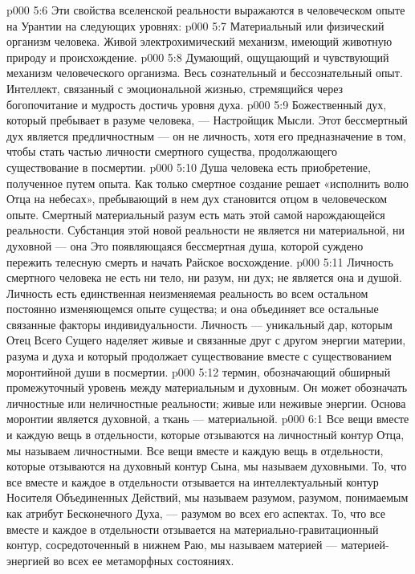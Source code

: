 \vs p000 5:6 \pc Эти свойства вселенской реальности выражаются в человеческом опыте на Урантии на следующих уровнях:
\vs p000 5:7 \bibnobreakspace {} Материальный или физический организм человека. Живой электрохимический механизм, имеющий животную природу и происхождение.
\vs p000 5:8 \bibnobreakspace {} Думающий, ощущающий и чувствующий механизм человеческого организма. Весь сознательный и бессознательный опыт. Интеллект, связанный с эмоциональной жизнью, стремящийся через богопочитание и мудрость достичь уровня духа.
\vs p000 5:9 \bibnobreakspace {} Божественный дух, который пребывает в разуме человека, --- Настройщик Мысли. Этот бессмертный дух является предличностным --- он не личность, хотя его предназначение в том, чтобы стать частью личности смертного существа, продолжающего существование в посмертии.
\vs p000 5:10 \bibnobreakspace {} Душа человека есть приобретение, полученное путем опыта. Как только смертное создание решает «исполнить волю Отца на небесах», пребывающий в нем дух становится отцом  в человеческом опыте. Смертный материальный разум есть мать этой самой нарождающейся реальности. Субстанция этой новой реальности не является ни материальной, ни духовной --- она  Это появляющаяся бессмертная душа, которой суждено пережить телесную смерть и начать Райское восхождение.
\vs p000 5:11 \bibnobreakspace {} Личность смертного человека не есть ни тело, ни разум, ни дух; не является она и душой. Личность есть единственная неизменяемая реальность во всем остальном постоянно изменяющемся опыте существа; и она объединяет все остальные связанные факторы индивидуальности. Личность --- уникальный дар, которым Отец Всего Сущего наделяет живые и связанные друг с другом энергии материи, разума и духа и который продолжает существование вместе с существованием моронтийной души в посмертии.
\vs p000 5:12 \bibnobreakspace {} термин, обозначающий обширный промежуточный уровень между материальным и духовным. Он может обозначать личностные или неличностные реальности; живые или неживые энергии. Основа моронтии является духовной, а ткань --- материальной.
\vs p000 6:1 Все вещи вместе и каждую вещь в отдельности, которые отзываются на личностный контур Отца, мы называем личностными. Все вещи вместе и каждую вещь в отдельности, которые отзываются на духовный контур Сына, мы называем духовными. То, что все вместе и каждое в отдельности отзывается на интеллектуальный контур Носителя Объединенных Действий, мы называем разумом, разумом, понимаемым как атрибут Бесконечного Духа, --- разумом во всех его аспектах. То, что все вместе и каждое в отдельности отзывается на материально\hyp{}гравитационный контур, сосредоточенный в нижнем Раю, мы называем материей --- материей\hyp{}энергией во всех ее метаморфных состояниях.
